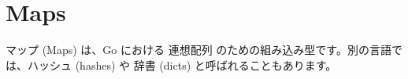 \section{Maps}

マップ (Maps) は、Go における 連想配列 のための組み込み型です。別の言語では、ハッシュ (hashes) や 辞書 (dicts) と呼ばれることもあります。





